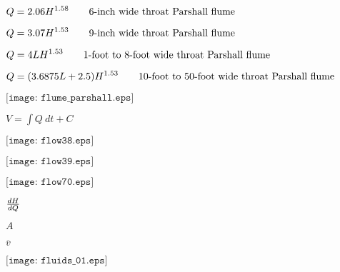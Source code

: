 \documentclass[12pt,a4paper,margin=2cm]{book}
\def\lthtmlcheckvsize{\ifdim\ht\sizebox<\vsize 
  \ifdim\wd\sizebox<\hsize\expandafter\hfill\fi \expandafter\vfill
  \else\expandafter\vss\fi}%
\begin{document}
{\newpage\clearpage
{}%
$\displaystyle Q = 2.06 H^{1.58} \hbox{\hskip 20pt 6-inch wide throat Parshall flume}$%
\lthtmlindisplaymathZ
\lthtmlcheckvsize\clearpage}

{\newpage\clearpage
{}%
$\displaystyle Q = 3.07 H^{1.53} \hbox{\hskip 20pt 9-inch wide throat Parshall flume}$%
\lthtmlindisplaymathZ
\lthtmlcheckvsize\clearpage}

{\newpage\clearpage
{}%
$\displaystyle Q = 4 L H^{1.53} \hbox{\hskip 20pt 1-foot to 8-foot wide throat Parshall flume}$%
\lthtmlindisplaymathZ
\lthtmlcheckvsize\clearpage}

{\newpage\clearpage
{}%
$\displaystyle Q = (3.6875 L + 2.5) H^{1.53} \hbox{\hskip 20pt 10-foot to 50-foot wide throat Parshall flume}$%
\lthtmlindisplaymathZ
\lthtmlcheckvsize\clearpage}

{\newpage\clearpage
{}%
$\displaystyle \texttt{[image: flume\_parshall.eps]}$%
\lthtmlindisplaymathZ
\lthtmlcheckvsize\clearpage}

{\newpage\clearpage
{}%
$ V = \int Q \> dt + C$%
\lthtmlindisplaymathZ
\lthtmlcheckvsize\clearpage}

{\newpage\clearpage
{}%
$\displaystyle \texttt{[image: flow38.eps]}$%
\lthtmlindisplaymathZ
\lthtmlcheckvsize\clearpage}

{\newpage\clearpage
{}%
$\displaystyle \texttt{[image: flow39.eps]}$%
\lthtmlindisplaymathZ
\lthtmlcheckvsize\clearpage}

{\newpage\clearpage
{}%
$\displaystyle \texttt{[image: flow70.eps]}$%
\lthtmlindisplaymathZ
\lthtmlcheckvsize\clearpage}

{\newpage\clearpage
{}%
$ dH \over dQ$%
\lthtmlindisplaymathZ
\lthtmlcheckvsize\clearpage}

{\newpage\clearpage
{}%
$ A$%
\lthtmlindisplaymathZ
\lthtmlcheckvsize\clearpage}

{\newpage\clearpage
{}%
$ \overline{v}$%
\lthtmlindisplaymathZ
\lthtmlcheckvsize\clearpage}

{\newpage\clearpage
{}%
$\displaystyle \texttt{[image: fluids\_01.eps]}$%
\lthtmlindisplaymathZ
\lthtmlcheckvsize\clearpage}
\end{document}
